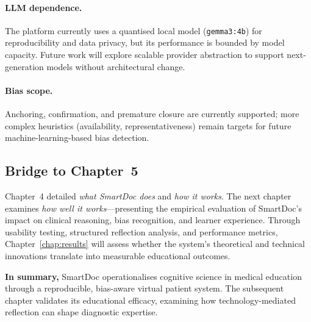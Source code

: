 \paragraph{LLM dependence.}
The platform currently uses a quantised local model (\texttt{gemma3:4b}) for
reproducibility and data privacy, but its performance is bounded by model
capacity. Future work will explore scalable provider abstraction to support
next-generation models without architectural change.

\paragraph{Bias scope.}
Anchoring, confirmation, and premature closure are currently supported; more
complex heuristics (availability, representativeness) remain targets for
future machine-learning-based bias detection.

\subsection{Bridge to Chapter~5}

Chapter~4 detailed \emph{what SmartDoc does} and \emph{how it works}.
The next chapter examines \emph{how well it works}—presenting the empirical
evaluation of SmartDoc’s impact on clinical reasoning, bias recognition, and
learner experience.
Through usability testing, structured reflection analysis, and performance
metrics, Chapter~\ref{chap:results} will assess whether the system’s theoretical
and technical innovations translate into measurable educational outcomes.

\medskip
\noindent
\textbf{In summary,} SmartDoc operationalises cognitive science in medical
education through a reproducible, bias-aware virtual patient system.
The subsequent chapter validates its educational efficacy, examining how
technology-mediated reflection can shape diagnostic expertise.
